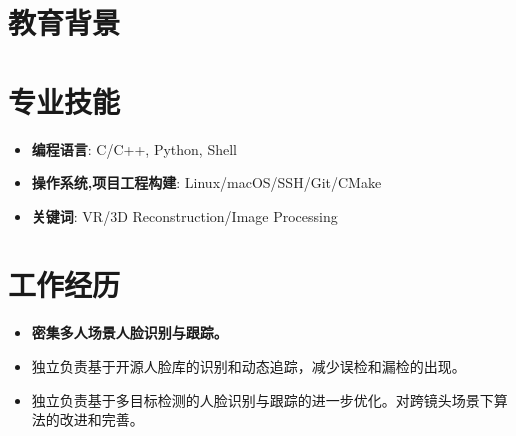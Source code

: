 \documentclass{resume}
\begin{document}




\section{教育背景}

\vspace{0.5em}

\section{专业技能}
\begin{itemize}[parsep=0.5ex]
  \item \textbf{编程语言}: C/C++, Python, Shell
  \item \textbf{操作系统,项目工程构建}: Linux/macOS/SSH/Git/CMake
  \item \textbf{关键词}: VR/3D Reconstruction/Image Processing
\end{itemize}


\section{工作经历}
\begin{itemize}
  \item \textbf{密集多人场景人脸识别与跟踪。}
  \item 独立负责基于开源人脸库的识别和动态追踪，减少误检和漏检的出现。
  \item 独立负责基于多目标检测的人脸识别与跟踪的进一步优化。对跨镜头场景下算法的改进和完善。
\end{itemize}
\end{document}
